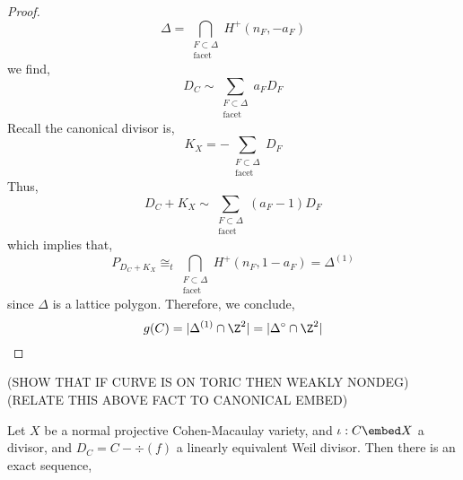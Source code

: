 \documentclass[12pt]{article}
\begin{document}
\begin{proof}
\[ \Delta = \bigcap_{\substack{F \subset \Delta \\ \text{facet}}} H^+(n_F, - a_F) \]
we find,
\[ D_C \sim \sum_{\substack{F \subset \Delta \\ \text{facet}}} a_F D_F \]
Recall the canonical divisor is,
\[ K_X = - \sum_{\substack{F \subset \Delta \\ \text{facet}}} D_F \]
Thus,
\[ D_C + K_X \sim \sum_{\substack{F \subset \Delta \\ \text{facet}}} (a_F - 1) D_F \]
which implies that,
\[ P_{D_C + K_X} \cong_t \bigcap_{\substack{F \subset \Delta \\ \text{facet}}} H^+(n_F, 1 - a_F) = \Delta^{(1)} \]
since $\Delta$ is a lattice polygon. Therefore, we conclude,
\[ g(C) = | \Delta^{(1)} \cap \Z^2 | = | \Delta^\circ \cap \Z^2 | \]
\end{proof}

(SHOW THAT IF CURVE IS ON TORIC THEN WEAKLY NONDEG)
(RELATE THIS ABOVE FACT TO CANONICAL EMBED)

\begin{theorem} \label{adjunction}
Let $X$ be a normal projective Cohen-Macaulay variety, and $\iota : C \embed X$ a divisor, and $D_C = C - \div{(f)}$ a linearly equivalent Weil divisor. Then there is an exact sequence,
\begin{center}
\end{center}
\end{theorem}
\end{document}

